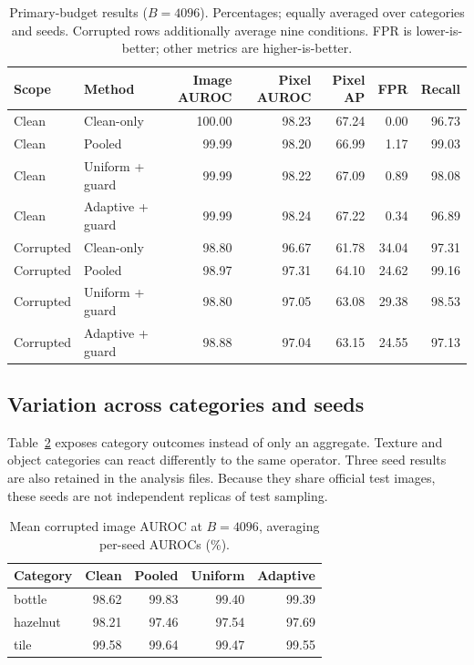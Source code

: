 \documentclass[10pt,twocolumn,letterpaper]{article}
\begin{document}
\begin{table}[t]
\centering\small
\caption{Primary-budget results ($B=4096$). Percentages; equally averaged over categories and seeds. Corrupted rows additionally average nine conditions. FPR is lower-is-better; other metrics are higher-is-better.}
\label{tab:main}
\begin{tabular}{llrrrrr}\toprule
Scope & Method & Image AUROC & Pixel AUROC & Pixel AP & FPR & Recall\\\midrule
Clean & Clean-only & 100.00 & 98.23 & 67.24 & 0.00 & 96.73 \\
Clean & Pooled & 99.99 & 98.20 & 66.99 & 1.17 & 99.03 \\
Clean & Uniform + guard & 99.99 & 98.22 & 67.09 & 0.89 & 98.08 \\
Clean & Adaptive + guard & 99.99 & 98.24 & 67.22 & 0.34 & 96.89 \\
\midrule
Corrupted & Clean-only & 98.80 & 96.67 & 61.78 & 34.04 & 97.31 \\
Corrupted & Pooled & 98.97 & 97.31 & 64.10 & 24.62 & 99.16 \\
Corrupted & Uniform + guard & 98.80 & 97.05 & 63.08 & 29.38 & 98.53 \\
Corrupted & Adaptive + guard & 98.88 & 97.04 & 63.15 & 24.55 & 97.13 \\
\bottomrule\end{tabular}
\end{table}

\subsection{Variation across categories and seeds}
Table~\ref{tab:categories} exposes category outcomes instead of only an aggregate. Texture and object categories can react differently to the same operator. Three seed results are also retained in the analysis files. Because they share official test images, these seeds are not independent replicas of test sampling.
\begin{table}[t]
\centering\small
\caption{Mean corrupted image AUROC at $B=4096$, averaging per-seed AUROCs (\%).}
\label{tab:categories}
\begin{tabular}{lrrrr}\toprule
Category & Clean & Pooled & Uniform & Adaptive\\\midrule
bottle & 98.62 & 99.83 & 99.40 & 99.39 \\
hazelnut & 98.21 & 97.46 & 97.54 & 97.69 \\
tile & 99.58 & 99.64 & 99.47 & 99.55 \\
\bottomrule\end{tabular}
\end{table}
\end{document}
